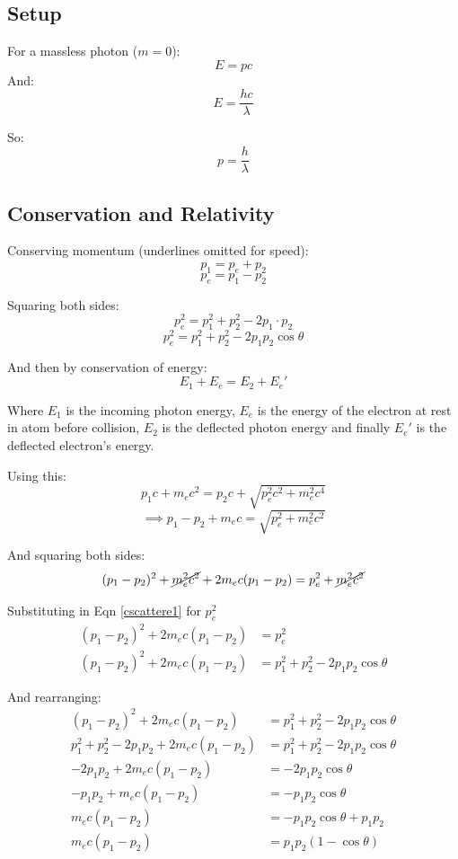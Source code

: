 \subsection*{Setup}
For a massless photon ($m = 0$):
\[
    E = pc
\]
And:
\[
    E = \frac{hc}{\lambda}
\]

So:
\begin{equation}
    p = \frac{h}{\lambda}
    \label{cscattere2}
\end{equation}

\subsection*{Conservation and Relativity}
Conserving momentum (underlines omitted for speed):
\[
    p_1 = p_e + p_2
\]
\[
    p_e = p_1 - p_2
\]

Squaring both sides:
\[
    p_e^2 = p_1^2 + p_2^2 - 2p_1 \cdot p_2
\]
\begin{equation}
    p_e^2 = p_1^2 + p_2^2 - 2p_1p_2 \cos \theta
    \label{cscattere1}    
\end{equation}

And then by conservation of energy:
\[
    E_1 + E_e = E_2 + E_e'
\]

Where $E_1$ is the incoming photon energy, $E_e$ is the energy of the electron at rest in atom before collision, $E_2$ is the deflected photon energy and finally $E_e'$ is the deflected electron's energy.

Using this:
\[
    p_1c + m_e c^2 = p_2 c + \sqrt{p_e^2c^2 + m_e^2c^4}
\]
\[
    \implies p_1 - p_2 + m_ec = \sqrt{p_e^2 + m_e^2c^2}
\]

And squaring both sides:
\[
    (p_1 - p_2)^2 + \cancel{m_e^2c^2} + 2m_ec(p_1 - p_2) = p_e^2 + \cancel{m_e^2c^2}
\]

Substituting in Eqn \ref{cscattere1} for $p_e^2$
\begin{align*}
    (p_1 - p_2)^2 + 2m_ec(p_1 - p_2) &= p_e^2\\
    (p_1 - p_2)^2 + 2m_ec(p_1 - p_2) &= p_1^2 + p_2^2 - 2p_1p_2 \cos \theta
\end{align*}

And rearranging:
\begin{align*}
    (p_1 - p_2)^2 + 2m_ec(p_1 - p_2) &= p_1^2 + p_2^2 - 2p_1p_2 \cos \theta\\
    p_1^2 + p_2^2 - 2p_1p_2 + 2m_ec(p_1 - p_2) &= p_1^2 + p_2^2 - 2p_1p_2 \cos \theta\\
    -2p_1p_2 + 2m_ec(p_1 - p_2) &= - 2p_1p_2 \cos \theta\\
    -p_1p_2 + m_ec(p_1 - p_2) &= - p_1p_2 \cos \theta\\
    m_ec(p_1 - p_2) &= - p_1p_2 \cos \theta + p_1p_2\\
    m_ec(p_1 - p_2) &= p_1p_2 (1 - \cos \theta) 
\end{align*}

